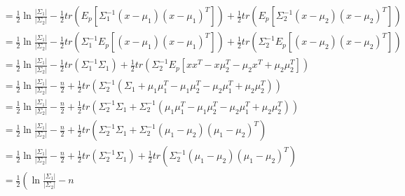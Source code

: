 \documentclass[UTF8,a4paper]{ctexart}
\begin{document}
\begin{small}
\begin{align}
    &= \frac{1}{2} \ln \frac{\left| \Sigma_1 \right|}{\left| \Sigma_2 \right|}
       -
       \frac{1}{2} tr
         \left(
             E_p\left[ \Sigma_1^{-1}\left( x - \mu_1 \right)\left( x - \mu_1 \right)^T \right]
         \right)
      +
      \frac{1}{2} tr
        \left(
            E_p\left[ \Sigma_2^{-1}\left( x - \mu_2 \right)\left( x - \mu_2 \right)^T \right]
        \right)\label{eq7}\\
    &= \frac{1}{2} \ln \frac{\left| \Sigma_1 \right|}{\left| \Sigma_2 \right|}
      -
      \frac{1}{2} tr
        \left(
            \Sigma_1^{-1}E_p\left[ \left( x - \mu_1 \right)\left( x - \mu_1 \right)^T \right]
        \right)
     +
     \frac{1}{2} tr
       \left(
           \Sigma_2^{-1}E_p\left[ \left( x - \mu_2 \right)\left( x - \mu_2 \right)^T \right]
       \right)\label{eq8}\\
   &= \frac{1}{2} \ln \frac{\left| \Sigma_1 \right|}{\left| \Sigma_2 \right|}
     -
     \frac{1}{2} tr
       \left(
           \Sigma_1^{-1}\Sigma_1
       \right)
    +
    \frac{1}{2} tr
      \left(
          \Sigma_2^{-1}E_p\left[ xx^T - x\mu_2^T - \mu_2x^T + \mu_2\mu_2^T \right]
      \right)\label{eq9}\\
    &= \frac{1}{2} \ln \frac{\left| \Sigma_1 \right|}{\left| \Sigma_2 \right|} - \frac{n}{2}
     +
     \frac{1}{2} tr
       \left(
           \Sigma_2^{-1}\left( \Sigma_1 + \mu_1\mu_1^T - \mu_1\mu_2^T - \mu_2\mu_1^T + \mu_2\mu_2^T \right)
       \right)\label{eq10}\\
    &= \frac{1}{2} \ln \frac{\left| \Sigma_1 \right|}{\left| \Sigma_2 \right|} - \frac{n}{2}
      +
      \frac{1}{2} tr
        \left(
            \Sigma_2^{-1}\Sigma_1 + \Sigma_2^{-1}\left( \mu_1\mu_1^T - \mu_1\mu_2^T - \mu_2\mu_1^T + \mu_2\mu_2^T \right)
        \right)\label{eq11}\\
    &= \frac{1}{2} \ln \frac{\left| \Sigma_1 \right|}{\left| \Sigma_2 \right|} - \frac{n}{2}
      +
      \frac{1}{2} tr
        \left(
            \Sigma_2^{-1}\Sigma_1 + \Sigma_2^{-1}\left( \mu_1 - \mu_2 \right)\left( \mu_1 - \mu_2 \right)^T
        \right)\label{eq12}\\
    &= \frac{1}{2} \ln \frac{\left| \Sigma_1 \right|}{\left| \Sigma_2 \right|} - \frac{n}{2}
      +
      \frac{1}{2} tr
        \left(
            \Sigma_2^{-1}\Sigma_1
        \right)
      +
      \frac{1}{2} tr
        \left(
            \Sigma_2^{-1}\left( \mu_1 - \mu_2 \right)\left( \mu_1 - \mu_2 \right)^T
        \right)\label{eq13}\\
    &= \frac{1}{2} \left( \ln \frac{\left| \Sigma_1 \right|}{\left| \Sigma_2 \right|} - n

\end{align}
\end{small}
\end{document}
